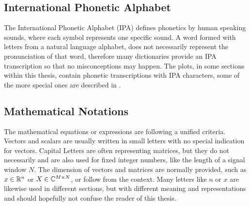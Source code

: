 
\subsection{International Phonetic Alphabet}\label{sec:intro_overview_ipa}
The International Phonetic Alphabet (IPA) defines phonetics by human speaking sounds, where each symbol represents one specific sound.
A word formed with letters from a natural language alphabet, does not necessarily represent the pronunciation of that word, therefore many dictionaries provide an IPA transcription so that no misconceptions may happen.
The plots, in some sections within this thesis, contain phonetic transcriptions with IPA characters, some of the more special ones are described in .



\subsection{Mathematical Notations}\label{sec:intro_overview_math}
The mathematical equations or expressions are following a unified criteria.
Vectors and scalars are usually written in small letters with no special indication for vectors.
Capital Letters are often representing matrices, but they do not necessarily and are also used for fixed integer numbers, like the length of a signal window $N$.
The dimension of vectors and matrices are normally provided, such as $x\in\mathbb{R}^n$ or $X\in\mathbb{C}^{M \times N}$, or follow from the context.
Many letters like $n$ or $x$ are likewise used in different sections, but with different meaning and representations and should hopefully not confuse the reader of this thesis.
